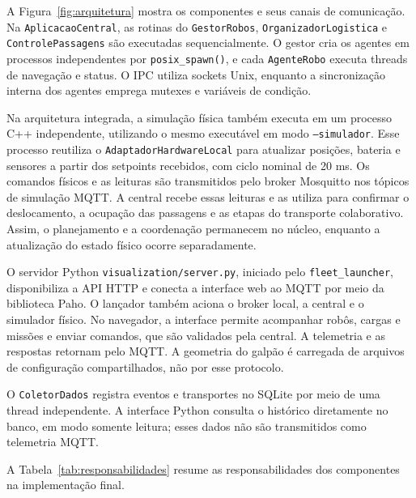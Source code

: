 \documentclass[12pt,a4paper]{article}
\newcommand{\code}[1]{\mbox{\texttt{#1}}}
\begin{document}
A Figura~\ref{fig:arquitetura} mostra os componentes e seus canais de
comunicação. Na \code{AplicacaoCentral}, as rotinas do \code{GestorRobos},
\code{OrganizadorLogistica} e \code{ControlePassagens} são executadas
sequencialmente. O gestor cria os agentes em processos independentes por
\code{posix\_spawn()}, e cada \code{AgenteRobo} executa threads de navegação e
status. O IPC utiliza sockets Unix, enquanto a sincronização interna dos
agentes emprega mutexes e variáveis de condição.

Na arquitetura integrada, a simulação física também executa em um processo C++
independente, utilizando o mesmo executável em modo \code{--simulador}. Esse
processo reutiliza o \code{AdaptadorHardwareLocal} para atualizar posições,
bateria e sensores a partir dos setpoints recebidos, com ciclo nominal de 20
ms. Os comandos físicos e as leituras são transmitidos pelo broker Mosquitto
nos tópicos de simulação MQTT. A central recebe essas leituras e as utiliza
para confirmar o deslocamento, a ocupação das passagens e as etapas do
transporte colaborativo. Assim, o planejamento e a coordenação permanecem no
núcleo, enquanto a atualização do estado físico ocorre separadamente.

O servidor Python \code{visualization/server.py}, iniciado pelo
\code{fleet\_launcher}, disponibiliza a API HTTP e conecta a interface web ao
MQTT por meio da biblioteca Paho. O lançador também aciona o broker local, a
central e o simulador físico. No navegador, a interface permite acompanhar
robôs, cargas e missões e enviar comandos, que são validados pela central. A
telemetria e as respostas retornam pelo MQTT. A geometria do galpão é carregada
de arquivos de configuração compartilhados, não por esse protocolo.

O \code{ColetorDados} registra eventos e transportes no SQLite por meio de uma
thread independente. A interface Python consulta o histórico diretamente no
banco, em modo somente leitura; esses dados não são transmitidos como
telemetria MQTT.

\noindent A Tabela~\ref{tab:responsabilidades} resume as responsabilidades dos componentes na implementação final.
\end{document}
